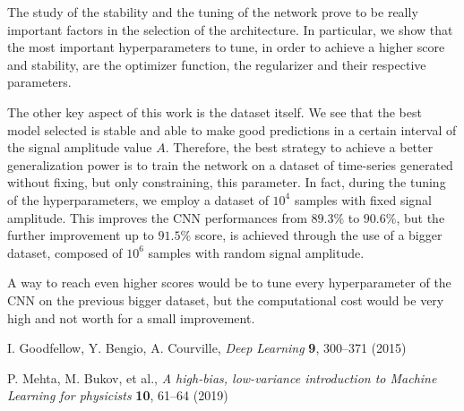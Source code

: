 \documentclass[prl,twocolumn]{revtex4-1}
\begin{document}
The study of the stability and the tuning of the network prove to be really important factors in the selection of the architecture. In particular, we show that the most important hyperparameters to tune, in order to achieve a higher score and stability, are the optimizer function, the regularizer and their respective parameters.

The other key aspect of this work is the dataset itself. We see that the best model selected is stable and able to make good predictions in a certain interval of the signal amplitude value $A$. Therefore, the best strategy to achieve a better generalization power is to train the network on a dataset of time-series generated without fixing, but only constraining, this parameter.
In fact, during the tuning of the hyperparameters, we employ a dataset of $10^4$ samples with fixed signal amplitude. This improves the CNN performances from $89.3\%$ to $90.6\%$, but the further improvement up to $91.5\%$ score, is achieved through the use of a bigger dataset, composed of $10^6$ samples with random signal amplitude.

A way to reach even higher scores would be to tune every hyperparameter of the CNN on the previous bigger dataset, but the computational cost would be very high and not worth for a small improvement.



\begin{thebibliography}{99}

    
I. Goodfellow, Y. Bengio, A. Courville,
\textit{Deep Learning} {\bf 9}, 300--371 (2015)

     
  P. Mehta, M. Bukov, et al., \textit{A high-bias, low-variance introduction to Machine Learning for physicists} {\bf 10}, 61--64 (2019)
\end{thebibliography}
\end{document}
